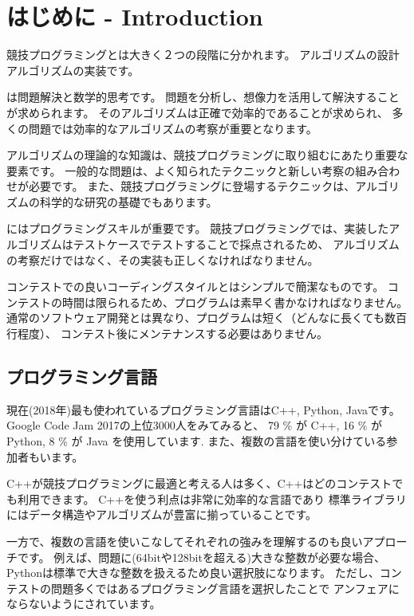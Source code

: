 \chapter{はじめに - Introduction}

競技プログラミングとは大きく２つの段階に分かれます。
アルゴリズムの設計アルゴリズムの実装です。

 は問題解決と数学的思考です。
問題を分析し、想像力を活用して解決することが求められます。
そのアルゴリズムは正確で効率的であることが求められ、
多くの問題では効率的なアルゴリズムの考察が重要となります。

アルゴリズムの理論的な知識は、競技プログラミングに取り組むにあたり重要な要素です。
一般的な問題は、よく知られたテクニックと新しい考察の組み合わせが必要です。
また、競技プログラミングに登場するテクニックは、アルゴリズムの科学的な研究の基礎でもあります。

 にはプログラミングスキルが重要です。
競技プログラミングでは、実装したアルゴリズムはテストケースでテストすることで採点されるため、
アルゴリズムの考察だけではなく、その実装も正しくなければなりません。

コンテストでの良いコーディングスタイルとはシンプルで簡潔なものです。
コンテストの時間は限られるため、プログラムは素早く書かなければなりません。
通常のソフトウェア開発とは異なり、プログラムは短く（どんなに長くても数百行程度）、
コンテスト後にメンテナンスする必要はありません。

\section{プログラミング言語}


現在(2018年)最も使われているプログラミング言語はC++, Python, Javaです。
Google Code Jam 2017の上位3000人をみてみると、
79 \% が C++,
16 \% が Python,
8 \% が Java を使用しています\cite{goo17}.
また、複数の言語を使い分けている参加者もいます。

C++が競技プログラミングに最適と考える人は多く、C++はどのコンテストでも利用できます。
C++を使う利点は非常に効率的な言語であり
標準ライブラリにはデータ構造やアルゴリズムが豊富に揃っていることです。

一方で、複数の言語を使いこなしてそれぞれの強みを理解するのも良いアプローチです。
例えば、問題に(64bitや128bitを超える)大きな整数が必要な場合、
Pythonは標準で大きな整数を扱えるため良い選択肢になります。
ただし、コンテストの問題多くではあるプログラミング言語を選択したことで
アンフェアにならないようにされています。

